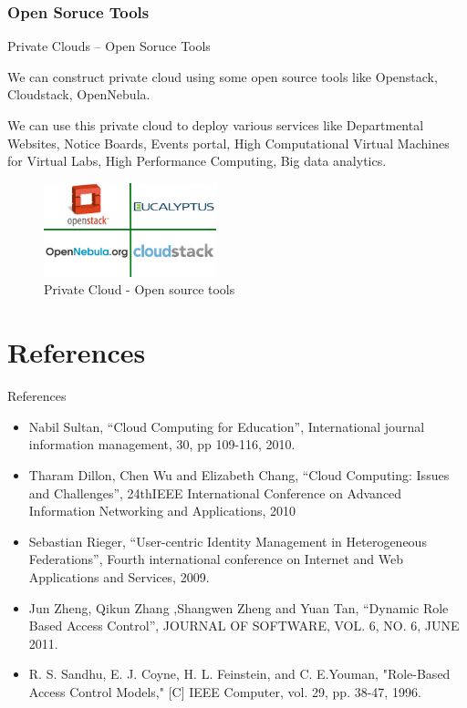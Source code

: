 \documentclass[10pt,xcolor=dvipsnames]{beamer}
\begin{document}
\subsubsection{Open Soruce Tools}
\begin{frame}{Private Clouds -- Open Soruce Tools}

We can construct private cloud using some open source tools like Openstack, Cloudstack, OpenNebula. \\

\hspace{4cm} 

We can use this private cloud to deploy various services like Departmental Websites, Notice Boards, Events portal, High Computational Virtual Machines for Virtual Labs, High Performance Computing, Big data analytics.
\begin{figure}[H]
 \centering
 \includegraphics[width=5cm]{./cloud.jpg}
 \caption{Private Cloud - Open source tools \label{fig:cloud} }
\end{figure}

\end{frame}


\section*{References}
\small
\begin{frame}{References}
\begin{itemize}
\item Nabil Sultan, ``Cloud Computing for Education”, International journal information management, 30, pp 109-116, 2010.
\item Tharam Dillon, Chen Wu and Elizabeth Chang, ``Cloud Computing: Issues and Challenges'',  24thIEEE International Conference on Advanced Information Networking and Applications, 2010 
\item Sebastian Rieger, ``User-centric Identity Management in Heterogeneous Federations'', Fourth international conference on Internet and Web Applications and Services, 2009.
\item Jun Zheng, Qikun Zhang ,Shangwen Zheng and Yuan Tan, ``Dynamic Role Based Access Control'',  JOURNAL OF SOFTWARE, VOL. 6, NO. 6, JUNE 2011.
\item R. S. Sandhu, E. J. Coyne, H. L. Feinstein, and C. E.Youman, "Role-Based Access Control Models," [C] IEEE Computer, vol. 29, pp. 38-47, 1996.

\end{itemize}
\end{frame}
\end{document}
